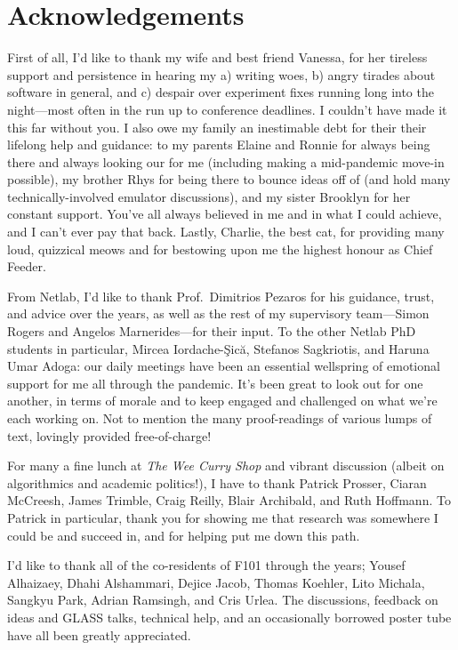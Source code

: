 \chapter*{Acknowledgements}

First of all, I'd like to thank my wife and best friend Vanessa, for her tireless support and persistence in hearing my a) writing woes, b) angry tirades about software in general, and c) despair over experiment fixes running long into the night---most often in the run up to conference deadlines.
I couldn't have made it this far without you.
I also owe my family an inestimable debt for their their lifelong help and guidance: to my parents Elaine and Ronnie for always being there and always looking our for me (including making a mid-pandemic move-in possible), my brother Rhys for being there to bounce ideas off of (and hold many technically-involved emulator discussions), and my sister Brooklyn for her constant support.
You've all always believed in me and in what I could achieve, and I can't ever pay that back. 
Lastly, Charlie, the best cat, for providing many loud, quizzical meows and for bestowing upon me the highest honour as Chief Feeder.

From Netlab, I'd like to thank Prof.\ Dimitrios Pezaros for his guidance, trust, and advice over the years, as well as the rest of my supervisory team---Simon Rogers and Angelos Marnerides---for their input.
To the other Netlab PhD students in particular, Mircea Iordache-\c{S}ic\u{a}, Stefanos Sagkriotis, and Haruna Umar Adoga: our daily meetings have been an essential wellspring of emotional support for me all through the pandemic.
It's been great to look out for one another, in terms of morale and to keep engaged and challenged on what we're each working on.
Not to mention the many proof-readings of various lumps of text, lovingly provided free-of-charge!

For many a fine lunch at \emph{The Wee Curry Shop} and vibrant discussion (albeit on algorithmics and academic politics!), I have to thank Patrick Prosser, Ciaran McCreesh, James Trimble, Craig Reilly, Blair Archibald, and Ruth Hoffmann.
To Patrick in particular, thank you for showing me that research was somewhere I could be and succeed in, and for helping put me down this path.

I'd like to thank all of the co-residents of F101 through the years; Yousef Alhaizaey, Dhahi Alshammari, Dejice Jacob, Thomas Koehler, Lito Michala, Sangkyu Park, Adrian Ramsingh, and Cris Urlea.
The discussions, feedback on ideas and GLASS talks, technical help, and an occasionally borrowed poster tube have all been greatly appreciated.

